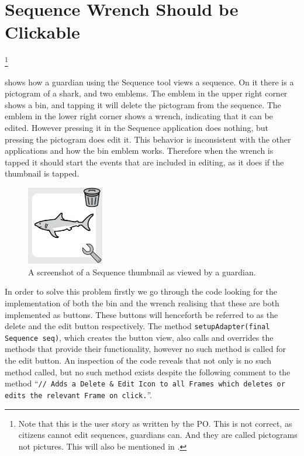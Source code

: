 \section{Sequence Wrench Should be Clickable}
\begin{center}
    \footnote{Note that this is the user story as written by the PO. This is not correct, as citizens cannot edit sequences, guardians can. And they are called pictograms not pictures. This will also be mentioned in .}
\end{center}

 shows how a guardian using the Sequence tool views a sequence.
On it there is a pictogram of a shark, and two emblems.
The emblem in the upper right corner shows a bin, and tapping it will delete the pictogram from the sequence.
The emblem in the lower right corner shows a wrench, indicating that it can be edited.
However pressing it in the Sequence application does nothing, but pressing the pictogram does edit it.
This behavior is inconsistent with the other applications and how the bin emblem works.
Therefore when the wrench is tapped it should start the events that are included in editing, as it does if the thumbnail is tapped.
\begin{figure}
    \centering
    \includegraphics[width=0.3\textwidth]{figures/img/screenshots/Sequence_pictogram.png}
    \caption{A screenshot of a Sequence thumbnail as viewed by a guardian.}\label{fig:seq_wrench}
    \vspace{-5pt}
\end{figure}
\bigskip
\noindent
In order to solve this problem firstly we go through the code looking for the implementation of both the bin and the wrench realising that these are both implemented as buttons.
These buttons will henceforth be referred to as the delete and the edit button respectively.
The method \texttt{setupAdapter(final Sequence seq)}, which creates the button view, also calls and overrides the methods that provide their functionality, however no such method is called for the edit button.
An inspection of the code reveals that not only is no such method called, but no such method exists despite the following comment to the method \enquote{\texttt{// Adds a Delete \& Edit Icon to all Frames which deletes or edits the relevant Frame on click.}}.

